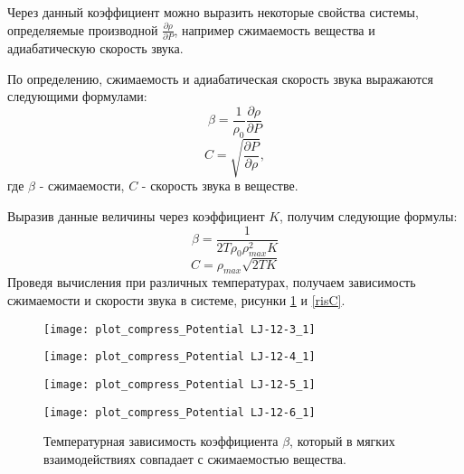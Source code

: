 Через данный коэффициент можно выразить некоторые свойства системы, определяемые производной $\frac{\partial \rho}{\partial P}$, например сжимаемость вещества и адиабатическую скорость звука.

По определению, сжимаемость и адиабатическая скорость звука выражаются следующими формулами:
\begin{equation}
\beta = \frac{1}{\rho_0} \frac{\partial \rho}{\partial P}
\label{eqBetaClassic}
\end{equation}
\begin{equation}
C = \sqrt{\frac{\partial P}{\partial \rho}},
\label{eqCClassic}
\end{equation}
где $\beta$ - сжимаемости, $C$ - скорость звука в веществе.

Выразив данные величины через коэффициент $K$, получим следующие формулы:
\begin{equation}
\beta = \frac{1}{2T\rho_0\rho_{max}^2K}
\label{eqBeta}
\end{equation}
\begin{equation}
C = \rho_{max}\sqrt{2TK}
\label{eqC}
\end{equation}
Проведя вычисления при различных температурах, получаем зависимость сжимаемости и скорости звука в системе, рисунки \ref{risBeta} и \ref{risC}.

\begin{figure}[h]
\begin{center}
\begin{minipage}[h]{0.45\linewidth}
\texttt{[image: plot\_compress\_Potential LJ-12-3\_1]}
\end{minipage}
\begin{minipage}[h]{0.45\linewidth}
\texttt{[image: plot\_compress\_Potential LJ-12-4\_1]}
\end{minipage}

\begin{minipage}[h]{0.45\linewidth}
\texttt{[image: plot\_compress\_Potential LJ-12-5\_1]}
\end{minipage}
\begin{minipage}[h]{0.45\linewidth}
\texttt{[image: plot\_compress\_Potential LJ-12-6\_1]}
\end{minipage}
\caption{Температурная зависимость коэффициента $\beta$, который в мягких взаимодействиях совпадает с сжимаемостью вещества.}
\label{risBeta}
\end{center}
\end{figure}


